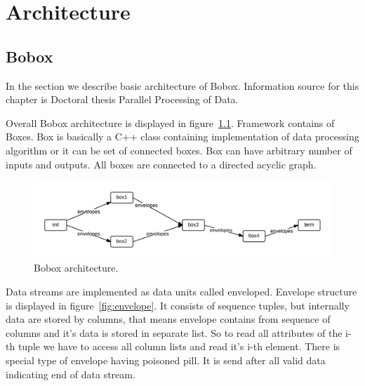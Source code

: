 \chapter{Architecture}

\section{Bobox}

In the section we describe basic architecture of Bobox. Information source for this chapter is Doctoral thesis Parallel Processing of Data\cite{faltthesis}. 

Overall Bobox architecture is displayed in figure~\ref{fig:bobox}. Framework contains of Boxes. Box is basically a C++ class containing implementation of data processing algorithm or it can be set of connected boxes. Box can have arbitrary number of inputs and outputs. All boxes are connected to a directed acyclic graph.  

\begin{figure}[h!]
  \centering
    \includegraphics[width=1\textwidth]{bobox}

      \caption{Bobox architecture.}
          \label{fig:bobox}
\end{figure}

Data streams are implemented as data units called enveloped. Envelope structure is displayed in figure~\ref{fig:envelope}. It consists of sequence tuples, but internally data are stored by columns, that means envelope contains from sequence of columns and it's data is stored in separate list. So to read all attributes of the i-th tuple we have to access all column lists and read it's i-th element. There is special type of envelope having poisoned pill. It is send after all valid data indicating end of data stream. 

